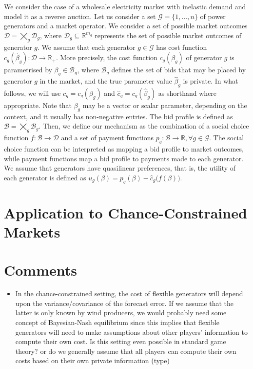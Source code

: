 \documentclass{article}
\begin{document}
We consider the case of a wholesale electricity market with inelastic demand and model it as a reverse auction. Let us consider a set $\mathcal{G} = \{1, \ldots, n\}$ of power generators and a market operator. We consider a set of possible market outcomes $\mathcal{D} = \bigtimes_g \mathcal{D}_g$, where $\mathcal{D}_g \subseteq \mathbb{R}^{m_g}$ represents the set of possible market outcomes of generator $g$. We assume that each generator $g \in \mathcal{G}$ has cost function $c_g(\hat{\beta}_g): \mathcal{D} \rightarrow \mathbb{R}_+$. More precisely, the cost function $c_g(\beta_g)$ of generator $g$ is parametrised by $\beta_g \in \mathcal{B}_g$, where $\mathcal{B}_g$ defines the set of bids that may be placed by generator $g$ in the market, and the true parameter value $\hat{\beta}_g$ is private. In what follows, we will use $c_g = c_g(\beta_g)$ and $\hat{c}_g = c_g(\hat{\beta}_g)$ as shorthand where appropriate. Note that $\beta_g$ may be a vector or scalar parameter, depending on the context, and it usually has non-negative entries. The bid profile is defined as $\mathcal{B} = \bigtimes_g \mathcal{B}_g$. Then, we define our mechanism as the combination of a social choice function $f: \mathcal{B} \rightarrow \mathcal{D}$ and a set of payment functions $p_g: \mathcal{B} \rightarrow \mathbb{R}, \forall g \in \mathcal{G}$. The social choice function can be interpreted as mapping a bid profile to market outcomes, while payment functions map a bid profile to payments made to each generator. We assume that generators have quasilinear preferences, that is, the utility of each generator is defined as $u_g(\beta) = p_g(\beta) - \hat{c}_g\big(f(\beta)\big)$.

\section{Application to Chance-Constrained Markets}

\section{Comments}

\begin{itemize}
\item In the chance-constrained setting, the cost of flexible generators will depend upon the variance/covariance of the forecast error. If we assume that the latter is only known by wind producers, we would probably need some concept of Bayesian-Nash equilibrium since this implies that flexible generators will need to make assumptions about other players' information to compute their own cost. Is this setting even possible in standard game theory? or do we generally assume that all players can compute their own costs based on their own private information (type)
\end{itemize}


\end{document}
